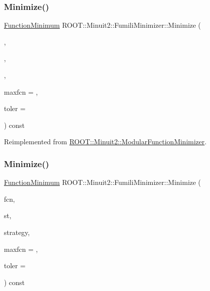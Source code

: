 \subsubsection{\texorpdfstring{Minimize()}{Minimize()}\hspace{0.1cm}{\footnotesize\ttfamily [3/33]}}
{\footnotesize\ttfamily \mbox{\hyperlink{classROOT_1_1Minuit2_1_1FunctionMinimum}{Function\+Minimum}} R\+O\+O\+T\+::\+Minuit2\+::\+Fumili\+Minimizer\+::\+Minimize (\begin{DoxyParamCaption}\item[{const \mbox{\hyperlink{classROOT_1_1Minuit2_1_1FCNBase}{F\+C\+N\+Base}} \&}]{,  }\item[{const \mbox{\hyperlink{classROOT_1_1Minuit2_1_1MnUserParameterState}{Mn\+User\+Parameter\+State}} \&}]{,  }\item[{const \mbox{\hyperlink{classROOT_1_1Minuit2_1_1MnStrategy}{Mn\+Strategy}} \&}]{,  }\item[{unsigned int}]{maxfcn = {},  }\item[{double}]{toler = {} }\end{DoxyParamCaption}) const\hspace{0.3cm}{\ttfamily [virtual]}}



Reimplemented from \mbox{\hyperlink{classROOT_1_1Minuit2_1_1ModularFunctionMinimizer_a1ae6ed90bc87c3db98388f3d26980a51}{R\+O\+O\+T\+::\+Minuit2\+::\+Modular\+Function\+Minimizer}}.

\mbox{\label{classROOT_1_1Minuit2_1_1FumiliMinimizer_afe0f09e5e093e65ac8fadc13c459ad5c}} 
\subsubsection{\texorpdfstring{Minimize()}{Minimize()}\hspace{0.1cm}{\footnotesize\ttfamily [4/33]}}
{\footnotesize\ttfamily \mbox{\hyperlink{classROOT_1_1Minuit2_1_1FunctionMinimum}{Function\+Minimum}} R\+O\+O\+T\+::\+Minuit2\+::\+Fumili\+Minimizer\+::\+Minimize (\begin{DoxyParamCaption}\item[{const \mbox{\hyperlink{classROOT_1_1Minuit2_1_1FCNGradientBase}{F\+C\+N\+Gradient\+Base}} \&}]{fcn,  }\item[{const \mbox{\hyperlink{classROOT_1_1Minuit2_1_1MnUserParameterState}{Mn\+User\+Parameter\+State}} \&}]{st,  }\item[{const \mbox{\hyperlink{classROOT_1_1Minuit2_1_1MnStrategy}{Mn\+Strategy}} \&}]{strategy,  }\item[{unsigned int}]{maxfcn = {},  }\item[{double}]{toler = {} }\end{DoxyParamCaption}) const\hspace{0.3cm}{\ttfamily [virtual]}}



